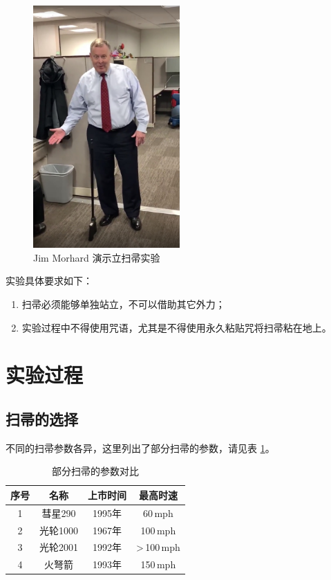 \documentclass[12pt,a4paper,UTF8]{article}
\begin{document}
  \begin{figure}[htbp]
    \centering
    \includegraphics[width=0.5\textwidth]{JimMorhard}
    \caption{Jim Morhard 演示立扫帚实验}
    \label{JimMorhard}
  \end{figure}

  实验具体要求如下：
  \begin{enumerate}
    \item 扫帚必须能够单独站立，不可以借助其它外力；
    \item 实验过程中不得使用咒语，尤其是不得使用永久粘贴咒将扫帚粘在地上。
  \end{enumerate}

  \section{实验过程}
  \subsection{扫帚的选择}
  不同的扫帚参数各异，这里列出了部分扫帚的参数，请见表 \ref{broomsticks}。

  \begin{table}[htbp]
    \centering
    \begin{tabular}{cccc}
      \toprule
      序号 & 名称 & 上市时间 & 最高时速 \\
      \midrule
      1 & 彗星290 & 1995年 & 60\,mph \\
      2 & 光轮1000 & 1967年 & 100\,mph \\
      3 & 光轮2001 & 1992年 & >\,100\,mph \\
      4 & 火弩箭 & 1993年 & 150\,mph \\
      \bottomrule
    \end{tabular}
    \caption{部分扫帚的参数对比}
    \label{broomsticks}
  \end{table}
\end{document}
